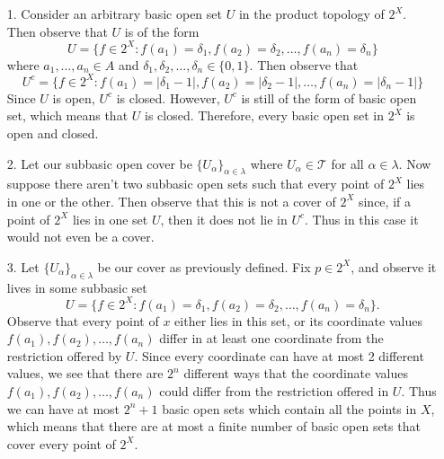 \documentclass[a4paper,12pt,twoside]{hmcpset}
\begin{document}
\begin{solution}
    \begin{itemize}
        \item[1.]Consider an arbitrary basic open set $U$ in the product topology of
        $2^X$. Then observe that $U$ is of the form 
        \[
           U = \{f \in 2^X : f(a_1) = \delta_1, f(a_2)= \delta_2, \dots, f(a_n)= \delta_n\} 
        \]
        where $a_1, \dots, a_n \in A$ and $\delta_1, \delta_2, \dots, \delta_n
        \in \{0, 1\}$. Then observe that 
        \[
            U^c = \{f \in 2^X: f(a_1) = |\delta_1-1|, f(a_2)= |\delta_2-1|, \dots, f(a_n)= |\delta_n-1|\}
        \]
        Since $U$ is open, $U^c$ is closed. However, $U^c$ is still of the form
        of basic open set, which means that $U$ is closed. Therefore, every
        basic open set in $2^X$ is open and closed.
    
        \item[2.] Let our subbasic open cover be $\{U_{\alpha}\}_{\alpha \in
        \lambda}$ where $U_\alpha \in \mathscr{T}$ for all $\alpha \in
        \lambda.$ Now suppose there aren't two subbasic open sets such
        that every point of $2^X$ lies in one or the other. Then observe
        that this is not a cover of $2^X$ since, if a point of $2^X$ lies
        in one set $U$, then it does not lie in $U^c$. Thus in this case
        it would not even be a cover.
    
     
        \item[3.] Let $\{U_\alpha\}_{\alpha \in \lambda}$ be our cover as
        previously defined. Fix $p \in 2^X$, and observe it lives in some
        subbasic set 
        \[
          U = \{f \in 2^X : f(a_1) = \delta_1, f(a_2) = \delta_2, \dots, f(a_n) = \delta_n \}. 
        \]
        Observe that every point of $x$ either lies in this set, or its
        coordinate values $f(a_1), f(a_2), \dots, f(a_n)$ differ in at least one
        coordinate from the restriction offered by $U$. Since every
        coordinate can have at most 2 different values, we see that there
        are $2^n$ different ways that the coordinate values $f(a_1),
        f(a_2), \dots , f(a_n)$ could differ from the restriction offered
        in $U$. Thus we can have at most $2^n + 1$ basic open sets
        which contain all the points in $X$, which means that there are at
        most a finite number of basic open sets that cover every point of $2^X$. 
    \end{itemize}
\end{solution}
\end{document}
